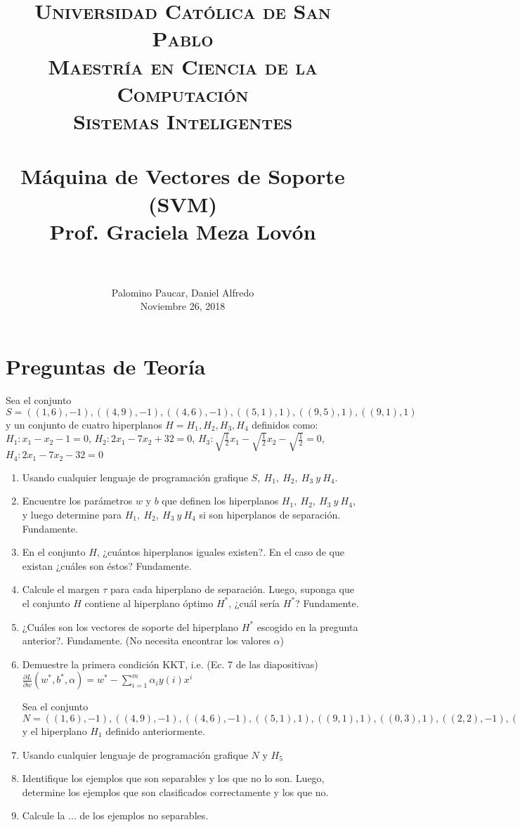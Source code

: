 \documentclass[paper=a4, fontsize=11pt]{scrartcl}
\title{
		\usefont{OT1}{bch}{b}{n}
		\normalfont \normalsize \textsc{Universidad Católica de San Pablo \\
		Maestría en Ciencia de la Computación \\
        Sistemas Inteligentes} \\ [25pt]
		\horrule{0.5pt} \\[0.4cm]
		\huge Máquina de Vectores de Soporte (SVM) \\
        Prof. Graciela Meza Lovón \\
		\horrule{2pt} \\[0.5cm]
}
\author{
		\normalfont 								\normalsize
        Palomino Paucar, Daniel Alfredo\\[-3pt]		\normalsize
        Noviembre 26, 2018
}
\date{}
\numberwithin{equation}{section}		%
\numberwithin{figure}{section}			%
\numberwithin{table}{section}				%
\begin{document}
\maketitle

\newpage
\section{Preguntas de Teoría}

Sea el conjunto $S={((1,6),-1), ((4,9),-1), ((4,6),-1), ((5,1),1), ((9,5),1), ((9,1),1)}$ y un conjunto de cuatro hiperplanos $H = {H_1, H_2, H_3, H_4}$ definidos como: $H_1: x_1 - x_2 -1 = 0$, $H_2: 2x_1 - 7x_2 +32 =0$, $H_3: \sqrt{\frac{1}{2}}x_1 - \sqrt{\frac{1}{2}}x_2 - \sqrt{\frac{1}{2}} = 0$, $H_4: 2x_1 - 7x_2 -32 = 0$

\begin{enumerate}
    \item Usando cualquier lenguaje de programación grafique $S,\ H_1,\ H_2,\ H_3\ y\ H_4$.
    
    \item Encuentre  los parámetros $w$ y $b$ que definen los hiperplanos $H_1,\  H_2,\ H_3\ y\ H_4$, y luego determine para $H_1,\  H_2,\ H_3\ y\ H_4$ si son hiperplanos de separación. Fundamente.
    
    \item En el conjunto $H$, ¿cuántos hiperplanos iguales existen?. En el caso de que existan ¿cuáles son éstos? Fundamente.
    
    \item Calcule el margen $\tau$ para cada hiperplano de separación. Luego, suponga que el conjunto $H$ contiene al hiperplano óptimo  $H^*$, ¿cuál sería $H^*$? Fundamente.
    
    \item ¿Cuáles son los vectores de soporte del hiperplano $H^*$ escogido en la pregunta anterior?. Fundamente. (No necesita encontrar los valores $\alpha$)
    
    \item Demuestre la primera condición KKT, i.e. (Ec. 7 de las diapositivas) $\frac{\partial L}{\partial w}(w^*, b^*, \alpha) = w^* - \sum_{i=1}^{m}\alpha_iy(i)x^{i}$
    
Sea el conjunto $N = {((1,6),-1), ((4,9),-1), ((4,6),-1), ((5,1),1), ((9,1),1), ((0,3),1), ((2,2),-1), ((3,1),-1)}$ y el hiperplano $H_1$ definido anteriormente.

    \item Usando cualquier lenguaje de programación grafique $N$ y $H_5$
    
    \item Identifique los ejemplos que son separables y los que no lo son. Luego, determine los ejemplos que son clasificados correctamente y los que no.
    
    \item Calcule la ... de los ejemplos no separables.

\end{enumerate}
\end{document}
